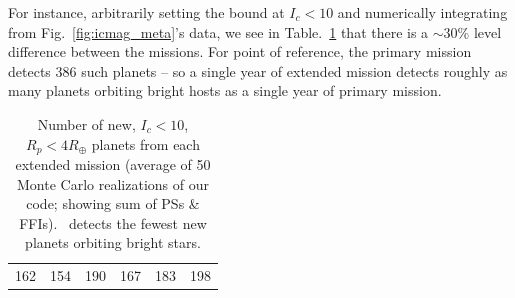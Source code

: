 For instance, arbitrarily setting the bound at $I_c<10$ and numerically integrating from Fig.~\ref{fig:icmag_meta}'s data, we see in Table.~\ref{tab:icmag_meta} that there is a $\sim30\%$ level difference between the missions.
For point of reference, the primary mission detects 386 such planets -- so a single year of extended mission detects roughly as many planets orbiting bright hosts as a single year of primary mission.
\begin{table}[!t]
	\centering
	\caption{Number of new, $I_c<10$, $R_p<4R_\oplus$ planets from each extended mission (average of 50 Monte Carlo realizations of our code; showing sum of PSs \& FFIs). \npole\ detects the fewest new planets orbiting bright stars.}
	\label{tab:icmag_meta}
	\begin{tabular}{|c|c|c|c|c|c|}
		\hline
		\nhemi & \npole & \shemiAvoid & \elong & \eshort & \hemis \\ \hline
		162    & 154    & 190         & 167    & 183     & 198    \\ \hline
	\end{tabular}
\end{table}

